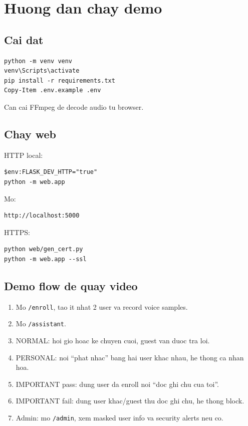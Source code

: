 \documentclass[12pt,a4paper]{article}
\begin{document}
\section{Huong dan chay demo}

\subsection{Cai dat}

\begin{lstlisting}
python -m venv venv
venv\Scripts\activate
pip install -r requirements.txt
Copy-Item .env.example .env
\end{lstlisting}

Can cai FFmpeg de decode audio tu browser.

\subsection{Chay web}

HTTP local:

\begin{lstlisting}
$env:FLASK_DEV_HTTP="true"
python -m web.app
\end{lstlisting}

Mo:

\begin{lstlisting}
http://localhost:5000
\end{lstlisting}

HTTPS:

\begin{lstlisting}
python web/gen_cert.py
python -m web.app --ssl
\end{lstlisting}

\subsection{Demo flow de quay video}

\begin{enumerate}
  \item Mo \texttt{/enroll}, tao it nhat 2 user va record voice samples.
  \item Mo \texttt{/assistant}.
  \item NORMAL: hoi gio hoac ke chuyen cuoi, guest van duoc tra loi.
  \item PERSONAL: noi ``phat nhac'' bang hai user khac nhau, he thong ca nhan hoa.
  \item IMPORTANT pass: dung user da enroll noi ``doc ghi chu cua toi''.
  \item IMPORTANT fail: dung user khac/guest thu doc ghi chu, he thong block.
  \item Admin: mo \texttt{/admin}, xem masked user info va security alerts neu co.
\end{enumerate}
\end{document}
